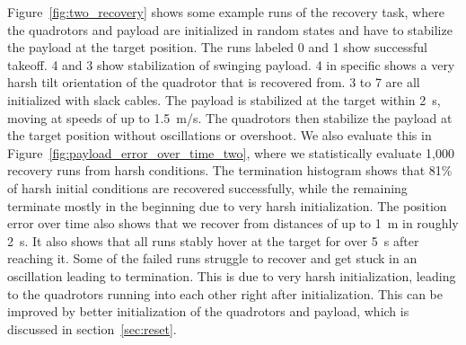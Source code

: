 Figure~\ref{fig:two_recovery} shows some example runs of the recovery task, where the quadrotors and payload are initialized in random states and have to stabilize the payload at the target position. The runs labeled 0 and 1 show successful takeoff. 4 and 3 show stabilization of swinging payload. 4 in specific shows a very harsh tilt orientation of the quadrotor that is recovered from. 3 to 7 are all initialized with slack cables. The payload is stabilized at the target within 2~s, moving at speeds of up to 1.5~m/s. The quadrotors then stabilize the payload at the target position without oscillations or overshoot.
We also evaluate this in Figure~\ref{fig:payload_error_over_time_two}, where we statistically evaluate 1,000 recovery runs from harsh conditions. The termination histogram shows that 81\% of harsh initial conditions are recovered successfully, while the remaining terminate mostly in the beginning due to very harsh initialization. The position error over time also shows that we recover from distances of up to 1~m in roughly 2~s. It also shows that all runs stably hover at the target for over 5~s after reaching it. Some of the failed runs struggle to recover and get stuck in an oscillation leading to termination. This is due to very harsh initialization, leading to the quadrotors running into each other right after initialization. This can be improved by better initialization of the quadrotors and payload, which is discussed in section~\ref{sec:reset}.

